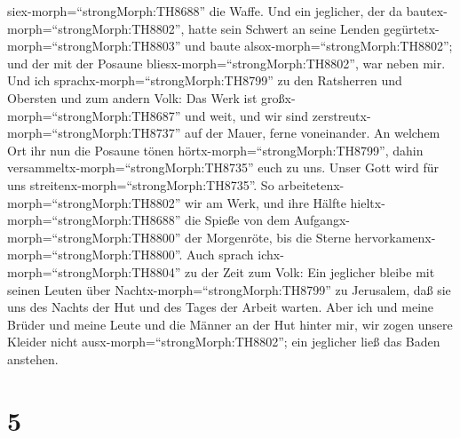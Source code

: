 siex-morph=``strongMorph:TH8688'' die Waffe.  Und ein
jeglicher, der da bautex-morph=``strongMorph:TH8802'', hatte sein
Schwert an seine Lenden gegürtetx-morph=``strongMorph:TH8803'' und baute
alsox-morph=``strongMorph:TH8802''; und der mit der Posaune
bliesx-morph=``strongMorph:TH8802'', war neben mir.  Und
ich sprachx-morph=``strongMorph:TH8799'' zu den Ratsherren und Obersten
und zum andern Volk: Das Werk ist großx-morph=``strongMorph:TH8687'' und
weit, und wir sind zerstreutx-morph=``strongMorph:TH8737'' auf der
Mauer, ferne voneinander.  An welchem Ort ihr nun die
Posaune tönen hörtx-morph=``strongMorph:TH8799'', dahin
versammeltx-morph=``strongMorph:TH8735'' euch zu uns. Unser Gott wird
für uns streitenx-morph=``strongMorph:TH8735''.  So
arbeitetenx-morph=``strongMorph:TH8802'' wir am Werk, und ihre Hälfte
hieltx-morph=``strongMorph:TH8688'' die Spieße von dem
Aufgangx-morph=``strongMorph:TH8800'' der Morgenröte, bis die Sterne
hervorkamenx-morph=``strongMorph:TH8800''.  Auch sprach
ichx-morph=``strongMorph:TH8804'' zu der Zeit zum Volk: Ein jeglicher
bleibe mit seinen Leuten über Nachtx-morph=``strongMorph:TH8799'' zu
Jerusalem, daß sie uns des Nachts der Hut und des Tages der Arbeit
warten.  Aber ich und meine Brüder und meine Leute und die
Männer an der Hut hinter mir, wir zogen unsere Kleider nicht
ausx-morph=``strongMorph:TH8802''; ein jeglicher ließ das Baden
anstehen.

\hypertarget{section-4}{%
\section{5}\label{section-4}}

